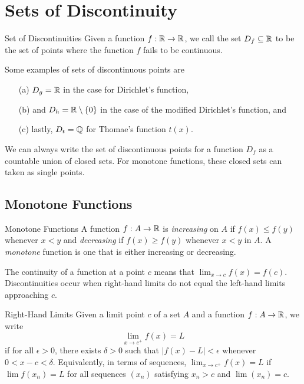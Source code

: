 \section{Sets of Discontinuity} 

\begin{definition}{Set of Discontinuities}{}
Given a function \( f: \mathbb{R} \to \mathbb{R}  \), we call the set \( D_f \subseteq \mathbb{R}  \) to be the set of points where the function \( f  \) fails to be continuous.
\end{definition}

Some examples of sets of discontinuous points are
\begin{enumerate}
    \item[(a)] \( D_g = \mathbb{R}  \) in the case for Dirichlet's function, 
    \item[(b)] and \( D_{h} = \mathbb{R} \setminus \{ 0 \}  \) in the case of the modified Dirichlet's function, and 
    \item[(c)] lastly, \( D_{t} = \mathbb{Q}  \) for Thomae's function \( t(x)  \).
\end{enumerate}

We can always write the set of discontinuous points for a function \( D_f  \) as a countable union of closed sets. For monotone functions, these closed sets can taken as single points.

\subsection{Monotone Functions}

\begin{definition}{Monotone Functions}{}
A function \( f: A \to \mathbb{R}  \) is \textit{increasing} on \( A \) if \( f(x) \leq f(y)  \) whenever \( x < y  \) and \textit{decreasing} if \( f(x) \geq f(y)  \) whenever \( x < y  \) in \( A  \). A \textit{monotone} function is one that is either increasing or decreasing.
\end{definition}

The continuity of a function at a point \( c  \) means that \( \lim_{ x \to c } f(x) = f(c) \). Discontinuities occur when right-hand limits do not equal the left-hand limits approaching \( c  \). 

\begin{definition}{Right-Hand Limits}{}
Given a limit point \( c  \) of a set \( A  \) and a function \( f: A \to \mathbb{R}  \), we write
\[ \lim_{ x \to c^{+}   }  f(x) = L \]
if for all \( \epsilon > 0  \), there exists \( \delta > 0  \) such that \( | f(x) -  L  | < \epsilon  \) whenever \( 0 < x - c < \delta  \). Equivalently, in terms of sequences, \( \lim_{ x  \to c^{+} } f(x) = L  \) if \( \lim f(x_n) = L  \) for all sequences \( (x_n)  \) satisfying \( x_n >  c  \) and \( \lim (x_n) = c  \).
\end{definition}

